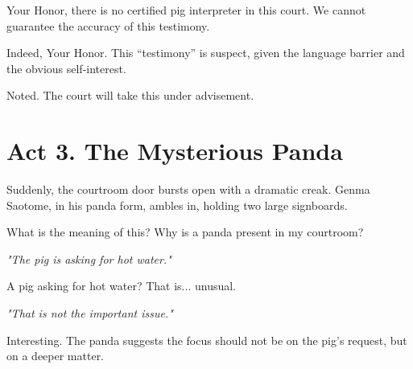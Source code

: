 \documentclass[12pt]{article}
\begin{document}
\begin{tcolorbox}[title=Court Clerk:]
Your Honor, there is no certified pig interpreter in this court. We cannot guarantee the accuracy of this testimony.
\end{tcolorbox}

\begin{tcolorbox}[title={Manager (smirking):}]
Indeed, Your Honor. This “testimony” is suspect, given the language barrier and the obvious self-interest.
\end{tcolorbox}

\begin{tcolorbox}[title={Judge (deadpan):}]
Noted. The court will take this under advisement.
\end{tcolorbox}

\section*{Act 3. The Mysterious Panda}

\begin{tcolorbox}[nobeforeafter,sharp corners=south, colframe=black!50!white, colback=white, fontupper=\itshape, center title, title=Stage Direction:]
Suddenly, the courtroom door bursts open with a dramatic creak. Genma Saotome, in his panda form, ambles in, holding two large signboards.
\end{tcolorbox}

\begin{tcolorbox}[title={Judge (startled):}]
What is the meaning of this? Why is a panda present in my courtroom?
\end{tcolorbox}

\begin{tcolorbox}[title={Genma (Panda) --- First Sign:}]
\textit{"The pig is asking for hot water."}
\end{tcolorbox}

\begin{tcolorbox}[title={Judge (raising an eyebrow):}]
A pig asking for hot water? That is... unusual.
\end{tcolorbox}

\begin{tcolorbox}[title={Genma (Panda) --- Second Sign:}]
\textit{"That is not the important issue."}
\end{tcolorbox}

\begin{tcolorbox}[title={Judge (considering):}]
Interesting. The panda suggests the focus should not be on the pig’s request, but on a deeper matter.
\end{tcolorbox}
\end{document}
